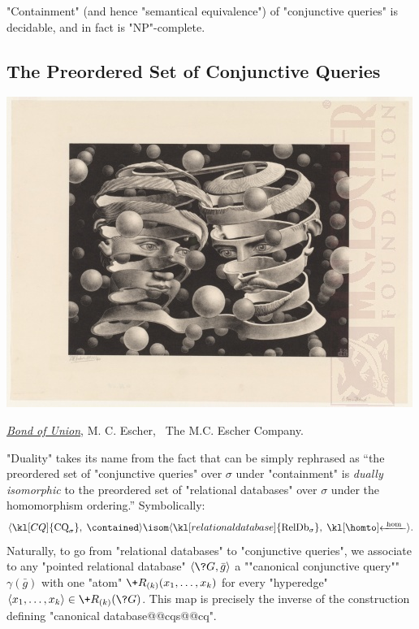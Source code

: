 \begin{corollary}
	\label{coro:prelim-db-containment-cq}
	"Containment" (and hence "semantical equivalence") of "conjunctive queries" is
	decidable, and in fact is "NP"-complete.
\end{corollary}


\subsection{The Preordered Set of Conjunctive Queries}
\label{sec:prelim-db-poset-cq}

\begin{marginfigure}
	\centering
	\includegraphics[width=\linewidth]{fig/escher/bound-of-union.jpg}
	\caption{\href{https://mcescher.com/gallery/most-popular/\#iLightbox[gallery\_image\_1]/23}{\emph{Bond of Union}}, M. C. Escher, \textcopyright~The M.C. Escher Company.}
\end{marginfigure}
"Duality" takes its name from the fact that  can be simply rephrased as
``the preordered set of "conjunctive queries" over $\sigma$ under
"containment" is \emph{dually isomorphic} to the preordered set of "relational databases"
over $\sigma$ under the homomorphism ordering.'' Symbolically: 
\[
	\tup{\kl[CQ]{\textrm{CQ}_\sigma},\; \contained }
	\isom
	\tup{\kl[relational database]{\textrm{RelDb}_\sigma},\; \cohomto }.
\]
Naturally, to go from "relational databases" to "conjunctive queries",
we associate to any "pointed relational database" $\tup{\?G, \bar g}$
a ""canonical conjunctive query"" $\gamma(\bar g)$ with one "atom"
$\+R_{(k)}(x_1,\hdots,x_k)$ for every "hyperedge" $\tup{x_1,\hdots,x_k} \in \+R_{(k)}(\?G)$.
This map is precisely the inverse of the construction defining "canonical database@@cqs@@cq".

